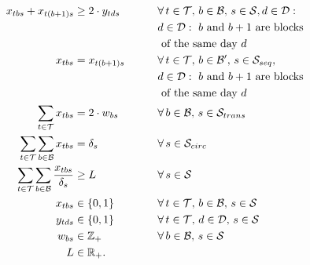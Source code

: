 \documentclass[review,3p,authoryear]{elsarticle}
\begin{document}
{\begin{alignat}{4}
    &                  && \quad & x_{tbs} + x_{t(b+1)s}       & \geq 2 \cdot y_{tds}   &\qquad & \forall\, t \in \mathcal{T},\, b \in \mathcal{B},\,s \in \mathcal{S}, d \in \mathcal{D} : \nonumber\\
    &                  &&       &                                                          &                 &\qquad & d \in \mathcal{D} : \text{ $b$ and $b+1$ are blocks} \nonumber\\
    &                  &&       &                                                          &                 &\qquad & \text{ of the same day $d$}\label{eq:m2-9}\\
    &                  && \quad & x_{tbs}       & = x_{t(b+1)s}   &\qquad & \forall\, t \in \mathcal{T},\, b \in \mathcal{B'},\,s \in \mathcal{S}_{seq},\, \nonumber\\
    &                  &&       &                                                          &                 &\qquad & d \in \mathcal{D} : \text{ $b$ and $b+1$ are blocks} \nonumber\\
    &                  &&       &                                                          &                 &\qquad & \text{ of the same day $d$}\label{eq:m2-10}\\
    &                  && \quad & \sum_{t \in \mathcal{T}} x_{tbs}   & = 2 \cdot w_{bs}  & \qquad & \forall\, b \in \mathcal{B},\,s \in \mathcal{S}_{trans}  \label{eq:m2-11}\\
    &                  && \quad & \sum_{t \in \mathcal{T}} \sum_{b \in \mathcal{B}} x_{tbs}      & = \delta_{s}     &\qquad & \forall\,s \in \mathcal{S}_{circ}  \label{eq:m2-12}\\    
    &                  && \quad & \sum_{t \in \mathcal{T}} \sum_{b \in \mathcal{B}} \frac{x_{tbs}}{\delta_{s}}   & \geq L     &\qquad & \forall\,s \in \mathcal{S}  \label{eq:m2-13}\\ 
    &                  &&       & x_{tbs}                           & \in \{0,1\}                 &        & \forall\, t \in \mathcal{T},\, b \in \mathcal{B},\, s \in \mathcal{S}\nonumber \\
    &                  &&       & y_{tds}                            & \in \{0,1\}                 &        & \forall\, t \in \mathcal{T},\, d \in \mathcal{D},\, s \in \mathcal{S}\nonumber \\
    &                  &&       & w_{bs}                         & \in \mathbb{Z_{+}}          &        & \forall\, b \in \mathcal{B},\, s \in \mathcal{S}\nonumber\\
    &                  &&       & L                         & \in \mathbb{R_{+}}.         &        &\nonumber
\end{alignat}
}
\end{document}
